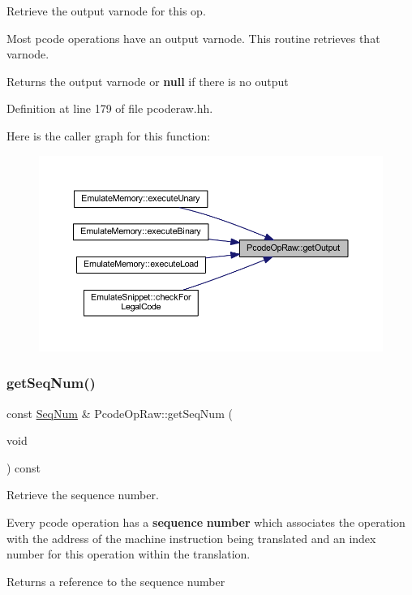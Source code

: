 Retrieve the output varnode for this op. 

Most pcode operations have an output varnode. This routine retrieves that varnode. \begin{DoxyReturn}{Returns}
the output varnode or {\bfseries{null}} if there is no output 
\end{DoxyReturn}


Definition at line 179 of file pcoderaw.\+hh.

Here is the caller graph for this function\+:
\nopagebreak
\begin{figure}[H]
\begin{center}
\leavevmode
\includegraphics[width=350pt]{class_pcode_op_raw_a74d17c5335e043ff228c1c5f5e97cd74_icgraph}
\end{center}
\end{figure}
\mbox{\label{class_pcode_op_raw_a7845603fd30656ce6c99273a8498f4a7}} 
\subsubsection{\texorpdfstring{getSeqNum()}{getSeqNum()}}
{\footnotesize\ttfamily const \mbox{\hyperlink{class_seq_num}{Seq\+Num}} \& Pcode\+Op\+Raw\+::get\+Seq\+Num (\begin{DoxyParamCaption}\item[{void}]{ }\end{DoxyParamCaption}) const\hspace{0.3cm}{\ttfamily [inline]}}



Retrieve the sequence number. 

Every pcode operation has a {\bfseries{sequence}} {\bfseries{number}} which associates the operation with the address of the machine instruction being translated and an index number for this operation within the translation. \begin{DoxyReturn}{Returns}
a reference to the sequence number 
\end{DoxyReturn}


